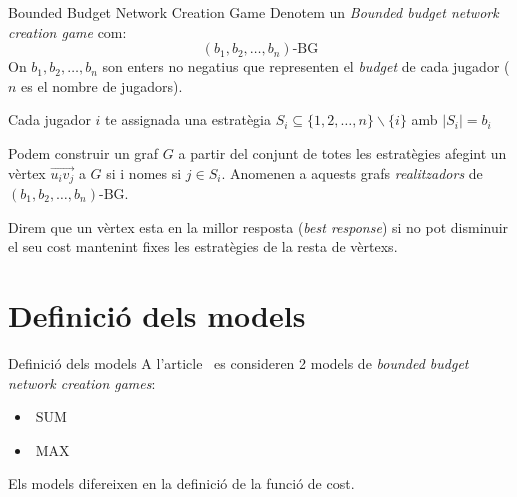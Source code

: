 \documentclass[aspectratio=169]{beamer}
\DeclareMathOperator{\SUM}{SUM}
\DeclareMathOperator{\MAX}{MAX}
\begin{document}
\begin{frame}{Bounded Budget Network Creation Game}
    Denotem un \emph{Bounded budget network creation game} com:
    $$ (b_1, b_2, \dots , b_n)\text{-BG} $$
    On $b_1,b_2, \dots , b_n$ son enters no negatius que representen el \emph{budget} de cada jugador ($n$ es el nombre de jugadors).
    
    \vspace{1em}
    
    Cada jugador $i$ te assignada una estratègia $S_i \subseteq \{1, 2, \dots , n\} \backslash \{i\}$ amb
    $|S_i| = b_i$
    
    \vspace{1em}
    
    Podem construir un graf $G$ a partir del conjunt de totes les estratègies afegint un vèrtex $\vec{u_iv_j}$
    a $G$ si i nomes si $j \in S_i$. Anomenen a aquests grafs \emph{realitzadors} de
    $ (b_1, b_2, \dots , b_n)\text{-BG} $.
    
    \vspace{1em}
    
    Direm que un vèrtex esta en la millor resposta (\emph{best response}) si no pot disminuir el seu
    cost mantenint fixes les estratègies de la resta de vèrtexs.
\end{frame}

\section{Definició dels models}

\begin{frame}{Definició dels models}
    A l'article~\cite{ehsani_bounded_2015} es consideren 2 models de \emph{bounded budget network creation games}:
    
    \vspace{1.5em}
    
    \begin{itemize}
    \item $\SUM$
    \item $\MAX$
    \end{itemize}
    
    \vspace{3em}
    
    Els models difereixen en la definició de la funció de cost.
\end{frame}
\end{document}

